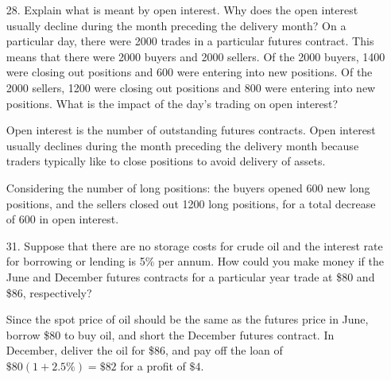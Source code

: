 \documentclass{article}
\begin{document}
\begin{itemize}
	\item[28.] Explain what is meant by open interest. Why does the open interest usually decline during the month preceding the delivery month? On a particular day, there were 2000 trades in a particular futures contract. This means that there were 2000 buyers and 2000 sellers. Of the 2000 buyers, 1400 were closing out positions and 600 were entering into new positions. Of the 2000 sellers, 1200 were closing out positions and 800 were entering into new positions. What is the impact of the day's trading on open interest?
		\begin{answer*}
			Open interest is the number of outstanding futures contracts. Open interest usually declines during the month preceding the delivery month because traders typically like to close positions to avoid delivery of assets. 

			Considering the number of long positions: the buyers opened 600 new long positions, and the sellers closed out 1200 long positions, for a total decrease of 600 in open interest.
		\end{answer*}

	\item[31.] Suppose that there are no storage costs for crude oil and the interest rate for borrowing or lending is 5\% per annum. How could you make money if the June and December futures contracts for a particular year trade at \$80 and \$86, respectively?
		\begin{answer*}
			Since the spot price of oil should be the same as the futures price in June, borrow \$80 to buy oil, and short the December futures contract. In December, deliver the oil for \$86, and pay off the loan of $\$80(1+2.5\%)=\$82$ for a profit of $\$4.$
		\end{answer*}
		
\end{itemize}
\end{document}
